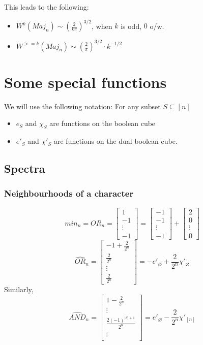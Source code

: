 \documentclass{sig-alternate}
\begin{document}
This leads to the following:
\begin{itemize}
\item $W^k(Maj_n) \sim (\frac{2}{k\pi})^{3/2}$, when $k$ is odd, $0$ o/w.
\item $W^{>=k}(Maj_n) \sim (\frac{2}{\pi})^{3/2} \cdot k^{-1/2}$
\end{itemize}

\section{Some special functions}
\noindent We will use the following notation: For any subset $S \subseteq [n]$
\begin{itemize}
\item $e_S$ and $\chi_S$ are functions on the boolean cube
\item $e'_S$ and $\chi'_S$ are functions on the dual boolean cube.
\end{itemize}

\subsection{Spectra}
\subsubsection {Neighbourhoods of a character}
\[ min_n = OR_n = \begin{bmatrix}
				1 \\
				-1 \\
				\vdots \\
				-1
				\end{bmatrix}
				 =
				 \begin{bmatrix}
				-1 \\
				-1 \\
				\vdots \\
				-1
				\end{bmatrix}
				+
				\begin{bmatrix}
				2 \\
				0 \\
				\vdots \\
				0
				\end{bmatrix}
				\]
\[ \widehat{OR}_n = \begin{bmatrix}
				-1 + \frac{2}{2^n}\\
				\frac{2}{2^n} \\
				\vdots \\
				\frac{2}{2^n}
				\end{bmatrix}
				= -e'_{\varnothing} + \frac{2}{2^n}\chi'_{\varnothing}
				\]
Similarly,
\[ \widehat{AND}_n = \begin{bmatrix}
				1 - \frac{2}{2^n}\\
				\vdots \\
				\frac{2(-1)^{|S| + 1}}{2^n} \\
				\vdots \\
				\end{bmatrix}
				= e'_{\varnothing} - \frac{2}{2^n}\chi'_{[n]}			
				\]
\end{document}
